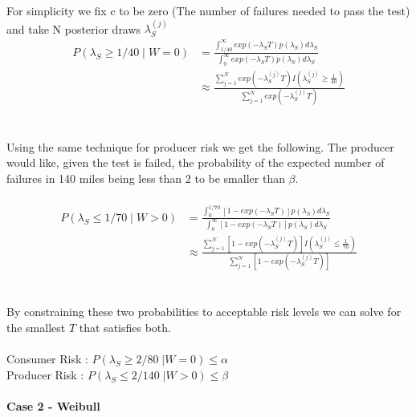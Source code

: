 \documentclass{article}
\begin{document}
For simplicity we fix c to be zero (The number of failures needed to pass the test) and take N posterior draws $ \lambda_S^{(j)} $
$$
\begin{aligned}
	 P(\lambda_S \geq 1/40 \; \vert \; W = 0) &= \frac{\int_{1/40}^{\infty} exp(-\lambda_S T)p(\lambda_S)d\lambda_S} {\int_{0}^{\infty} exp(-\lambda_S T)p(\lambda_S)d\lambda_S} \\
     &\approx \frac{\sum_{j = 1}^{N} exp(-\lambda_S^{(j)} T)I(\lambda_S^{(j)} \geq \frac{1}{40})} {\sum_{j = 1}^{N} exp(-\lambda_S^{(j)} T)}
\end{aligned}
$$
\\
\\
Using the same technique for producer risk we get the following. The producer would like, given the test is failed, the probability of the expected number of failures in 140 miles being less than 2 to be smaller than $\beta$.
\\
\\
$$
\begin{aligned}
	 P(\lambda_S \leq 1/70 \; \vert \; W > 0) &= \frac{\int_{0}^{1/70} [1 - exp(-\lambda_S T)]p(\lambda_S)d\lambda_S} {\int_{0}^{\infty} [1 - exp(-\lambda_S T)]p(\lambda_S)d\lambda_S} \\
     &\approx  \frac{\sum_{j = 1}^{N} [1 - exp(-\lambda_S^{(j)} T)] I(\lambda_S^{(j)} \leq \frac{1}{70})} {\sum_{j = 1}^{N} [1 - exp(-\lambda_S^{(j)} T)]}
\end{aligned}
$$
\\
\\
By constraining these two probabilities to acceptable risk levels we can solve for the smallest $ T $ that satisfies both.
\\
\\
Consumer Risk : $ P(\lambda_S \geq 2/80 \; \vert  W = 0) \leq \alpha $ \\
Producer Risk : $ P(\lambda_S \leq 2/140 \; \vert  W > 0) \leq \beta $
\\
\\
\textbf{Case 2 - Weibull}
\end{document}
